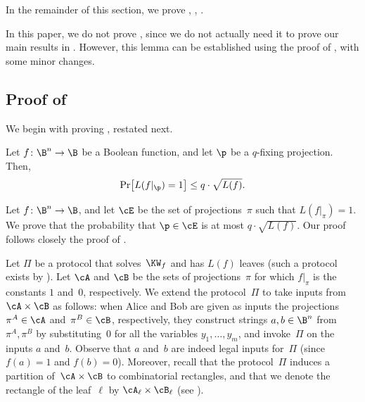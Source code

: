\noindent In the remainder of this section, we prove
,
,
.
\begin{remark}
In this paper, we do not prove , since we
%
do not actually need it to prove our main results in .
%
However, this lemma can be
established using the proof of ,
with some minor changes. 
\end{remark}


\subsection{\label{subsec:shrinkage-to-single-literal}Proof of }

We begin with proving , restated
next.
\begin{restated}{}
Let $f\colon\B^{n}\to\B$ be a Boolean function, and let $\p$ be
a $q$-fixing projection. Then, 
\[
\Pr\!\left[L(f|_{\p})=1\right]\le q\cdot\sqrt{L(f)}.
\]
\end{restated}

Let $f\colon\B^{n}\to\B$, and let $\cE$ be the set of projections~$\pi$
such that $L(f|_{\pi})=1$. We prove that the probability that $\p\in\cE$
is at most $q\cdot\sqrt{L(f)}$. Our proof follows closely the proof
of \cite[Lemma 4.1]{H98}.

Let $\Pi$ be a protocol that solves~$\KW_{f}$ and has $L(f)$ leaves
(such a protocol exists by ).
Let $\cA$ and $\cB$
be the sets of projections~$\pi$ for which $f|_{\pi}$ is the constants
$1$ and~$0$, respectively. We extend the protocol~$\Pi$ to take
inputs from~$\cA\times\cB$ as follows: when Alice and Bob are given
as inputs the projections $\pi^{A}\in\cA$ and~$\pi^{B}\in\cB$,
respectively, they construct strings $a,b\in\B^{n}$ from $\pi^{A},\pi^{B}$
by substituting~$0$ for all the variables $y_{1},\ldots,y_{m}$,
and invoke~$\Pi$ on the inputs $a$ and~$b$. Observe that $a$
and~$b$ are indeed legal inputs for~$\Pi$ (since $f(a)=1$ and
$f(b)=0$). Moreover, recall that the protocol~$\Pi$ induces a partition
of~$\cA\times\cB$ to combinatorial rectangles, and that we denote
the rectangle of the leaf~$\ell$ by $\cA_{\ell}\times\cB_{\ell}$
(see ).

